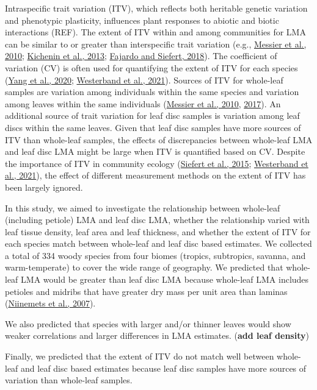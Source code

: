 \documentclass[
  12pt,
  a4paper,
,tablecaptionabove
]{scrartcl}
\begin{document}
Intraspecific trait variation (ITV), which reflects both heritable genetic variation and phenotypic plasticity, influences plant responses to abiotic and biotic interactions (REF).
The extent of ITV within and among communities for LMA can be similar to or greater than interspecific trait variation (e.g., \protect\hyperlink{ref-Messier2010}{Messier et al., 2010}; \protect\hyperlink{ref-Kichenin2013}{Kichenin et al., 2013}; \protect\hyperlink{ref-Fajardo2018}{Fajardo and Siefert, 2018}).
The coefficient of variation (CV) is often used for quantifying the extent of ITV for each species (\protect\hyperlink{ref-Yang2020}{Yang et al., 2020}; \protect\hyperlink{ref-Westerband2021}{Westerband et al., 2021}).
Sources of ITV for whole-leaf samples are variation among individuals within the same species and variation among leaves within the same individuals (\protect\hyperlink{ref-Messier2010}{Messier et al., 2010}, \protect\hyperlink{ref-Messier2017}{2017}).
An additional source of trait variation for leaf disc samples is variation among leaf discs within the same leaves.
Given that leaf disc samples have more sources of ITV than whole-leaf samples, the effects of discrepancies between whole-leaf LMA and leaf disc LMA might be large when ITV is quantified based on CV.
Despite the importance of ITV in community ecology (\protect\hyperlink{ref-Siefert2015}{Siefert et al., 2015}; \protect\hyperlink{ref-Westerband2021}{Westerband et al., 2021}), the effect of different measurement methods on the extent of ITV has been largely ignored.

In this study, we aimed to investigate the relationship between whole-leaf (including petiole) LMA and leaf disc LMA,
whether the relationship varied with leaf tissue density, leaf area and leaf thickness, and
whether the extent of ITV for each species match between whole-leaf and leaf disc based estimates.
We collected a total of 334 woody species from four biomes (tropics, subtropics, savanna, and warm-temperate) to cover the wide range of geography.
We predicted that whole-leaf LMA would be greater than leaf disc LMA because whole-leaf LMA includes petioles and midribs that have greater dry mass per unit area than laminas (\protect\hyperlink{ref-Niinemets2007}{Niinemets et al., 2007}).

We also predicted that species with larger and/or thinner leaves would show weaker correlations and larger differences in LMA estimates.
(\textbf{add leaf density})

Finally, we predicted that the extent of ITV do not match well between whole-leaf and leaf disc based estimates because leaf disc samples have more sources of variation than whole-leaf samples.
\end{document}
